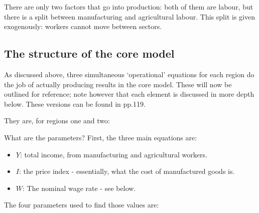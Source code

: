 
There are only two factors that go into production: both of them are labour, but there is a split between manufacturing and agricultural labour. This split is given exogenously: workers cannot move between sectors.



\subsection{The structure of the core model \label{sec:structure_coremodel}}

As discussed above, three simultaneous `operational' equations for each region do the job of actually producing results in the core model. These will now be outlined for reference; note however that each element is discussed in more depth below. These versions can be found in \citeauthor{brakman_new_2009} pp.119.

They are, for regions one and two:

  


What are the parameters? First, the three main equations are:

\begin{itemize}
	\item $Y$: total income, from manufacturing and agricultural workers.
	\item $I$: the price index - essentially, what the cost of manufactured goods is.
	\item $W$: The nominal wage rate - see below. 
\end{itemize}

The four parameters used to find those values are:

